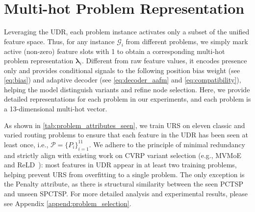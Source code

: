 \documentclass{article}
\theoremstyle{plain}
\theoremstyle{definition}
\theoremstyle{remark}
\begin{document}
\clearpage
\section{Multi-hot Problem Representation}
\label{append:multi_hot}
Leveraging the UDR, each problem instance activates only a subset of the unified feature space. Thus, for any instance $\mathcal{G}_{i}$ from different problems, we simply mark active (non-zero) feature slots with 1 to obtain a corresponding multi-hot problem representation $\bm{\lambda}_{i}$. Different from raw feature values, it encodes presence only and provides conditional signals to the following position bias weight (see \cref{eq:bias}) and adaptive decoder (see \cref{eq:decoder_aafm} and \cref{eq:compatibility}), helping the model distinguish variants and refine node selection. Here, we provide detailed representations for each problem in our experiments, and each problem is a 13-dimensional multi-hot vector. 

As shown in \cref{tab:problem_attributes_seen}, we train URS on eleven classic and varied routing problems to ensure that each feature in the UDR has been seen at least once, i.e., $\mathcal{P}=\{P_i\}_{i=1}^{11}$. We adhere to the principle of minimal redundancy and strictly align with existing work on CVRP variant selection (e.g., MVMoE~\citep{zhou2024mvmoe} and ReLD~\citep{huang2025reld}): most features in UDR appear in at least two training problems, helping prevent URS from overfitting to a single problem. The only exception is the Penalty attribute, as there is structural similarity between the seen PCTSP and unseen SPCTSP. For more detailed analysis and experimental results, please see Appendix \ref{append:problem_selection}.
\end{document}
